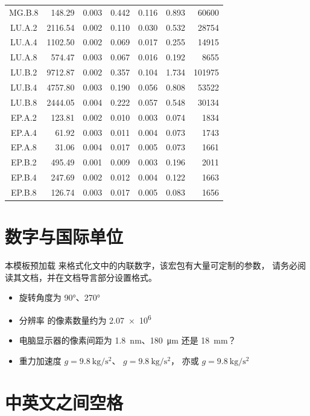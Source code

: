 \begin{longtable}[c]{@{}c*{6}{r}@{}}
  MG.B.8 & 148.29 & 0.003 & 0.442 & 0.116 & 0.893 & 60600 \\
  LU.A.2 & 2116.54 & 0.002 & 0.110 & 0.030 & 0.532 & 28754 \\
  LU.A.4 & 1102.50 & 0.002 & 0.069 & 0.017 & 0.255 & 14915 \\
  LU.A.8 & 574.47 & 0.003 & 0.067 & 0.016 & 0.192 & 8655 \\
  LU.B.2 & 9712.87 & 0.002 & 0.357 & 0.104 & 1.734 & 101975 \\
  LU.B.4 & 4757.80 & 0.003 & 0.190 & 0.056 & 0.808 & 53522 \\
  LU.B.8 & 2444.05 & 0.004 & 0.222 & 0.057 & 0.548 & 30134 \\
  EP.A.2 & 123.81 & 0.002 & 0.010 & 0.003 & 0.074 & 1834 \\
  EP.A.4 & 61.92 & 0.003 & 0.011 & 0.004 & 0.073 & 1743 \\
  EP.A.8 & 31.06 & 0.004 & 0.017 & 0.005 & 0.073 & 1661 \\
  EP.B.2 & 495.49 & 0.001 & 0.009 & 0.003 & 0.196 & 2011 \\
  EP.B.4 & 247.69 & 0.002 & 0.012 & 0.004 & 0.122 & 1663 \\
  EP.B.8 & 126.74 & 0.003 & 0.017 & 0.005 & 0.083 & 1656 \\
\end{longtable}

\section{数字与国际单位}

本模板预加载  来格式化文中的内联数字，该宏包有大量可定制的参数，
请务必阅读其文档，并在文档导言部分设置格式。

\begin{itemize}
  \item 旋转角度为 \ang{90}、\ang{270}
  \item 分辨率  的像素数量约为 \num{2.07e6}
  \item 电脑显示器的像素间距为 \SI{1.8}{\nm}、\SI{180}{\um} 还是 \SI{18}{\mm}？
  \item 重力加速度 $g=\SI{9.8}{\kg\per\square\second}$、
  $g=\SI[inter-unit-product=\ensuremath{{}\cdot{}}]{9.8}{\kg\per\square\second}$，
  亦或 $g=\SI[per-mode=symbol]{9.8}{\kg\per\square\second}$
\end{itemize}

\section{中英文之间空格}

